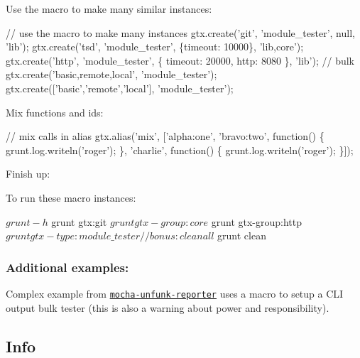 Use the macro to make many similar instances\+: 
\begin{DoxyCode}
// use the macro to make many instances
gtx.create('git', 'module\_tester', null, 'lib');
gtx.create('tsd', 'module\_tester', \{timeout: 10000\}, 'lib,core');
gtx.create('http', 'module\_tester', \{
    timeout: 20000,
    http: 8080
\}, 'lib');
// bulk
gtx.create('basic,remote,local', 'module\_tester');
gtx.create(['basic','remote','local'], 'module\_tester');
\end{DoxyCode}


Mix functions and id\textquotesingle{}s\+: 
\begin{DoxyCode}
// mix calls in alias
gtx.alias('mix', ['alpha:one', 'bravo:two', function() \{
    grunt.log.writeln('roger');
\}, 'charlie', function() \{
    grunt.log.writeln('roger');
\}]);
\end{DoxyCode}


Finish up\+: 


To run these macro instances\+: 
\begin{DoxyCode}
$ grunt -h
$ grunt gtx:git
$ grunt gtx-group:core
$ grunt gtx-group:http
$ grunt gtx-type:module\_tester

// bonus: clean all
$ grunt clean
\end{DoxyCode}


\subsubsection*{Additional examples\+:}


\begin{DoxyItemize}
\item Complex example from \href{https://github.com/Bartvds/mocha-unfunk-reporter/blob/abc2732c1c44aca17dc8a7c647aa1f3d7313279e/Gruntfile.js}{\tt mocha-\/unfunk-\/reporter} uses a macro to setup a C\+LI output bulk tester (this is also a warning about power and responsibility).
\end{DoxyItemize}

\subsection*{Info}


